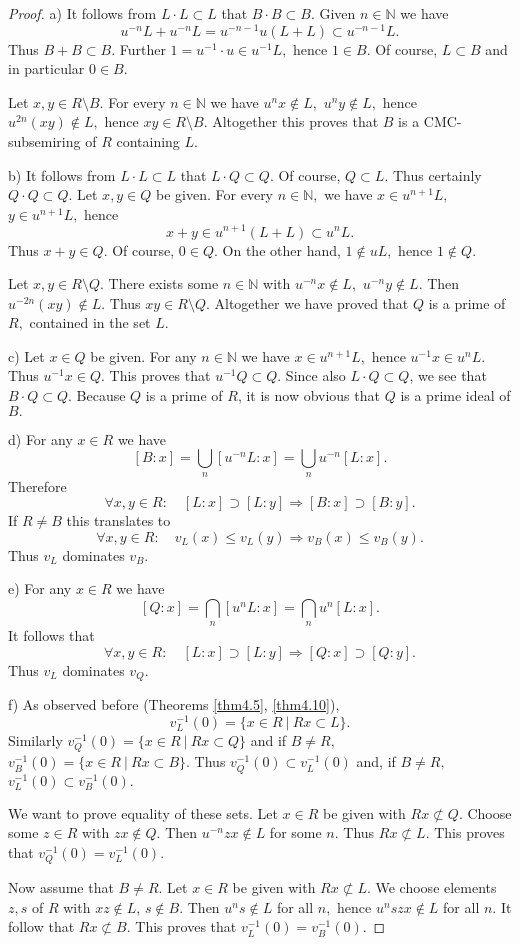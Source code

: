 \documentclass [12pt,a4paper,reqno]{amsart}
\begin{document}
\begin{proof}
a) It follows from $L\cdot L\subset L$ that $B\cdot B\subset B.$
Given $n\in\mathbb N$ we have
$$u^{-n}L+u^{-n}L=u^{-n-1}u(L+L)\subset u^{-n-1}L.$$
Thus $B+B\subset B.$ Further $1=u^{-1}\cdot u\in u^{-1}L, $ hence
$1\in B.$ Of course, $L\subset B$ and in particular $0\in B.$

Let $x,y\in R\setminus B.$ For every $n\in\mathbb N$ we have
$u^nx\notin L,$ $u^ny\notin L,$ hence $u^{2n}(xy)\notin L,$ hence
$xy\in R\setminus B.$ Altogether this proves that $B$ is a
CMC-subsemiring of $R$ containing $L.$ {\vskip 1.5mm \noindent}

b) It follows from $L\cdot L\subset L$ that $L\cdot Q\subset Q.$
Of course, $Q\subset L.$ Thus certainly $Q\cdot Q\subset Q.$ Let
$x,y\in Q$ be given. For every $n\in\mathbb N, $ we have $x\in
u^{n+1} L,$ $y\in u^{n+1}L,$ hence
$$x+y\in u^{n+1}(L+L)\subset u^nL.$$
Thus $x+y\in Q.$ Of course, $0\in Q.$ On the other hand, $1\notin
uL, $ hence $1\notin Q.$

Let $x,y\in R\setminus Q.$ There exists some $n\in \mathbb N$ with
$u^{-n}x\notin L,$ $u^{-n}y\notin L.$ Then $u^{-2n}(xy)\notin L.$
Thus $xy\in R\setminus Q.$ Altogether we have proved that $Q$ is a
prime of $R,$ contained in the set $L.$ {\vskip 1.5mm \noindent}

c) Let $x\in Q$ be given. For any $n\in\mathbb N $ we have $x\in
u^{n+1}L,$ hence $u^{-1}x\in u^nL.$ Thus $u^{-1}x\in Q.$ This
proves that $u^{-1}Q\subset Q.$ Since also $L\cdot Q\subset Q$, we
see that $B\cdot Q\subset Q.$ Because $Q$ is a prime of $R$, it is
now obvious that $Q$ is a prime ideal of $B.$ {\vskip 1.5mm \noindent}

 d) For any
$x\in R$ we have
$$[B:x]=\bigcup_n[u^{-n}L:x]=\bigcup_nu^{-n}[L:x].$$
Therefore
$$\forall x,y\in R: \quad [L:x]\supset[L:y]\Rightarrow
[B:x]\supset[B:y].$$ If $R\ne B$ this translates to
$$\forall x,y\in R: \quad v_L(x)\le v_L(y)\Rightarrow v_B(x)\le
v_B(y).$$ Thus $v_L$ dominates $v_B.$ {\vskip 1.5mm \noindent}

 e) For any $x\in R$
we have
$$[Q:x]=\bigcap_n[u^nL:x]=\bigcap_nu^n[L:x].$$
It follows that
$$\forall x,y\in R: \quad [L:x]\supset[L:y]\Rightarrow
[Q:x]\supset[Q:y].$$   Thus $v_L$ dominates $v_Q.$ {\vskip 1.5mm \noindent}

 f) As
observed before (Theorems \ref{thm4.5}, \ref{thm4.10}),
$$v_L^{-1}(0)=\{x\in R{\ {|} \ }Rx\subset L\}.$$
Similarly $v_Q^{-1}(0)=\{x\in R {\ {|} \ }Rx\subset Q\}$ and if $B\ne
R,$ $v_B^{-1}(0)=\{x\in R {\ {|} \ }Rx\subset B\}.$ Thus
$v_Q^{-1}(0)\subset v_L^{-1}(0)$ and, if $B\ne R,$
$v_L^{-1}(0)\subset v_B^{-1}(0).$

We want to prove equality of these sets. Let $x\in R$ be given
with $Rx\not\subset  Q.$ Choose some $z\in R$ with $zx\notin Q.$
Then $u^{-n}zx\notin L$ for some $n.$ Thus $Rx\not\subset L.$ This
proves that $v_Q^{-1}(0)=v_L^{-1}(0).$

Now assume that $B\ne R.$ Let $x\in R$ be given with $Rx \not
\subset  L$. We choose elements $z,s$ of $R$ with  $xz \notin L$,
$s \notin B.$ Then $u^ns\notin L$ for all $n,$ hence $u^nszx\notin
L$ for all $n.$ It follow that $Rx\not\subset B.$ This proves that
$v_L^{-1}(0)=v_B^{-1}(0).$
\end{proof}
\end{document}
